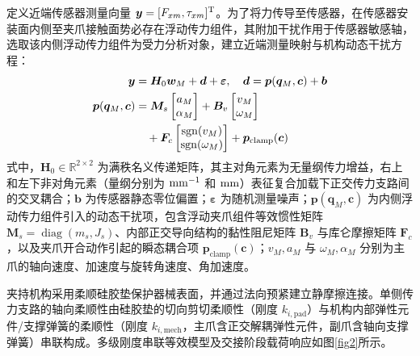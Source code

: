\documentclass{JQRnew}
\begin{document}
定义近端传感器测量向量 $\bm{y} = [F_{xm},\tau_{xm}]^{\rm T}$。为了将力传导至传感器，在传感器安装面内侧至夹爪接触面势必存在浮动传力组件，其附加干扰作用于传感器敏感轴，选取该内侧浮动传力组件为受力分析对象，建立近端测量映射与机构动态干扰方程：
\begin{align}
	\label{eq2}
	\bm{y} &= \bm{H}_{0}\bm{w}_{M} + \bm{d} + \bm{\varepsilon},\quad \bm{d} = \bm{p}(\bm{q}_{M},\bm{c}) + \bm{b} \\
	\label{eq3}
	\bm{p}(\bm{q}_{M},\bm{c}) &= \bm{M}_{s}
	\begin{bmatrix}
		a_{M} \\
		\alpha_{M}
	\end{bmatrix}
	+ \bm{B}_{v}
	\begin{bmatrix}
		v_{M} \\
		\omega_{M}
	\end{bmatrix} \notag \\
	&\quad + \bm{F}_{c}
	\begin{bmatrix}
		\operatorname{sgn}(v_{M}) \\
		\operatorname{sgn}(\omega_{M})
	\end{bmatrix}
	+ \bm{p}_{\text{clamp}}(\bm{c})
\end{align}
式中，$\bm{H}_{0} \in \mathbb{R}^{2 \times 2}$ 为满秩名义传递矩阵，其主对角元素为无量纲传力增益，右上和左下非对角元素（量纲分别为 ${\rm mm}^{-1}$ 和 ${\rm mm}$）表征复合加载下正交传力支路间的交叉耦合；$\bm{b}$ 为传感器静态零位偏置；$\bm{\varepsilon}$ 为随机测量噪声；$\bm{p}(\bm{q}_{M},\bm{c})$ 为内侧浮动传力组件引入的动态干扰项，包含浮动夹爪组件等效惯性矩阵 $\bm{M}_{s} = \operatorname{diag}(m_{s},J_{s})$、内部正交导向结构的黏性阻尼矩阵 $\bm{B}_{v}$ 与库仑摩擦矩阵 $\bm{F}_{c}$，以及夹爪开合动作引起的瞬态耦合项 $\bm{p}_{\text{clamp}}(\bm{c})$；$v_{M}, a_{M}$ 与 $\omega_{M}, \alpha_{M}$ 分别为主爪的轴向速度、加速度与旋转角速度、角加速度。


夹持机构采用柔顺硅胶垫保护器械表面，并通过法向预紧建立静摩擦连接。单侧传力支路的轴向柔顺性由硅胶垫的切向剪切柔顺性（刚度 $k_{i,\text{pad}}$）与机构内部弹性元件/支撑弹簧的柔顺性（刚度 $k_{i,\text{mech}}$，主爪含正交解耦弹性元件，副爪含轴向支撑弹簧）串联构成。多级刚度串联等效模型及交接阶段载荷响应如图\ref{fig2}所示。
\end{document}
